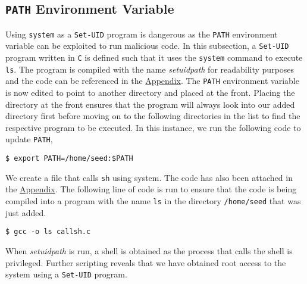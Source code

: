 \documentclass[a4paper,12pt]{article}
\begin{document}
\subsection{\texttt{PATH} Environment Variable} \label{PATH}
Using \texttt{system} as a \texttt{Set-UID} program is dangerous as the \texttt{PATH} environment variable can be exploited to run malicious code. In this subsection, a \texttt{Set-UID} program written in \texttt{C} is defined such that it uses the \texttt{system} command to execute \texttt{ls}. The program is  compiled with the name \textit{setuidpath} for readability purposes and the code can be referenced in the \hyperref[Appsec:3.6]{Appendix}. The \texttt{PATH} environment variable is now edited to point to another directory and placed at the front. Placing the directory at the front ensures that the program will always look into our added directory first before moving on to the following directories in the list to find the respective program to be executed. In this instance, we run the following code to update \texttt{PATH},
\begin{verbatim}$ export PATH=/home/seed:$PATH\end{verbatim}
We create a file that calls \texttt{sh} using system. The code has also been attached in the \hyperref[Appsec:3.6.2]{Appendix}. The following line of code is run to ensure that the code is being compiled into a program with the name \texttt{ls} in the directory \texttt{/home/seed} that was just added.
\begin{verbatim}
$ gcc -o ls callsh.c
\end{verbatim}
When \textit{setuidpath} is run, a shell is obtained as the process that calls the shell is privileged. Further scripting reveals that we have obtained root access to the system using a \texttt{Set-UID} program.\\
\end{document}

